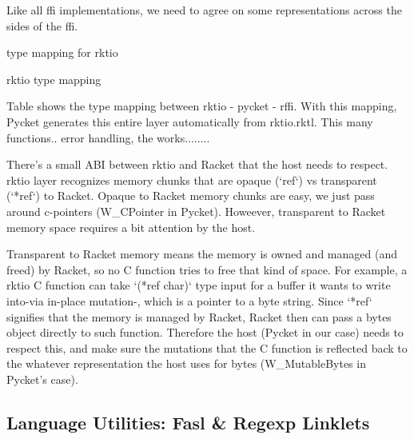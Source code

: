 				\begin{paragraph-here}%
					Like all ffi implementations, we need to agree on some representations across the sides of the ffi.
				\end{paragraph-here}

				\begin{table-here}
					type mapping for rktio

					\begin{todo}
						rktio type mapping
					\end{todo}
				\end{table-here}

				\begin{paragraph-here}%
					Table shows the type mapping between rktio - pycket - rffi. With this mapping, Pycket generates this entire layer automatically from rktio.rktl. This many functions.. error handling, the works........
				\end{paragraph-here}

				\begin{paragraph-here}%
					There's a small ABI between rktio and Racket that the host needs to respect. rktio layer recognizes memory chunks that are opaque (`ref`) vs transparent (`*ref`) to Racket. Opaque to Racket memory chunks are easy, we just pass around c-pointers (W\_CPointer in Pycket). Howeever, transparent to Racket memory space requires a bit attention by the host.
				\end{paragraph-here}

				\begin{paragraph-here}%
					Transparent to Racket memory means the memory is owned and managed (and freed) by Racket, so no C function tries to free that kind of space. For example, a rktio C function can take `(*ref char)` type input for a buffer it wants to write into-via in-place mutation-, which is a pointer to a byte string. Since `*ref` signifies that the memory is managed by Racket, Racket then can pass a bytes object directly to such function. Therefore the host (Pycket in our case) needs to respect this, and make sure the mutations that the C function is reflected back to the whatever representation the host uses for bytes (W\_MutableBytes in Pycket's case).
				\end{paragraph-here}

		\subsection{Language Utilities: Fasl \& Regexp Linklets}

